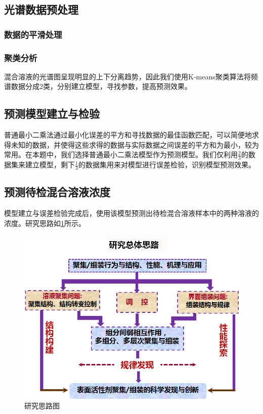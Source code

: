 \documentclass[UTF8]{ctexart}
\begin{document}
\subsection{光谱数据预处理}
\subsubsection{数据的平滑处理}
\subsubsection{聚类分析}
混合溶液的光谱图呈现明显的上下分离趋势，因此我们使用K-means聚类算法将频谱数据分成2类，分别建立模型，寻找参数，提高预测效果。

\subsection{预测模型建立与检验}
普通最小二乘法通过最小化误差的平方和寻找数据的最佳函数匹配，可以简便地求得未知的数据，并使得这些求得的数据与实际数据之间误差的平方和为最小，较为常用。在本题中，我们选择普通最小二乘法模型作为预测模型。我们仅利用$ \frac{2}{3} $的数据集来建立模型，剩下$ \frac{1}{3} $的数据集用来对模型进行误差检验，识别模型预测效果。

\subsection{预测待检混合溶液浓度}
模型建立与误差检验完成后，使用该模型预测出待检混合溶液样本中的两种溶液的浓度。研究思路如\ref{fig:1}所示。

\begin{figure}[htbp]
	\centering
	\includegraphics[width=1.0\linewidth]{flow.png}
	\caption{研究思路图}
	\label{fig:1}
\end{figure}
\end{document}
